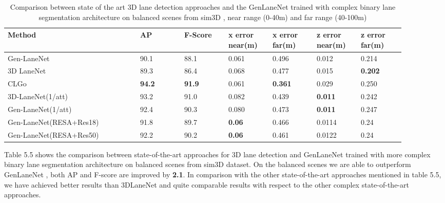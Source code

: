     \begin{table}[htbp]
    \addtolength{\tabcolsep}{-1pt}
    \begin{center}
    \caption{Comparison between state of the art 3D lane detection approaches and the GenLaneNet \cite{guo2020gen} trained with complex binary lane segmentation architecture on balanced scenes from sim3D \cite{guo2020gen}, near range (0-40m) and far range (40-100m)}
    \begin{tabular}{|p{0.3\linewidth}|p{0.1\linewidth}|p{0.1\linewidth}|p{0.1\linewidth}|p{0.1\linewidth}|p{0.1\linewidth}|p{0.1\linewidth}|}
    \hline
        \textbf{Method} & \textbf{AP} & \textbf{F-Score} & \textbf{x error near(m)} & \textbf{x error far(m)} & \textbf{z error near(m)} & \textbf{z error far(m)} \\ \hline
        Gen-LaneNet\cite{guo2020gen} & 90.1 & 88.1 & 0.061 & 0.496 & 0.012 & 0.214 \\ \hline
        3D LaneNet \cite{DBLP:journals/corr/abs-1811-10203}& 89.3 & 86.4 & 0.068 & 0.477 & 0.015 & \textbf{0.202} \\ \hline
        CLGo \cite{DBLP:journals/corr/abs-2112-15351}& \textbf{94.2} &\textbf{ 91.9} & 0.061 & \textbf{0.361} & 0.029 & 0.250 \\ \hline
        3D-LaneNet(1/att) \cite{9506296} &  93.2 & 91.0 & 0.082 & 0.439 & \textbf{0.011} & 0.242 \\ \hline
        Gen-LaneNet(1/att) \cite{9506296}& 92.4 & 90.3 & 0.080 & 0.473 & \textbf{0.011} & 0.247 \\ \hline
        Gen-LaneNet(RESA+Res18) & 91.8 & 89.7 & \textbf{0.06} & 0.466 & 0.0114 & 0.24 \\ \hline
        Gen-LaneNet(RESA+Res50) & 92.2 & 90.2 &\textbf{ 0.06} & 0.461 & 0.0122 & 0.24 \\ \hline
    \end{tabular}
    \end{center}
    \end{table}
    
    Table 5.5 shows the comparison between state-of-the-art approaches for 3D lane detection and GenLaneNet \cite{guo2020gen} trained with more complex binary lane segmentation architecture on balanced scenes from sim3D dataset\cite{guo2020gen}. On the balanced scenes we are able to outperform GenLaneNet \cite{guo2020gen}, both AP and F-score are improved by \textbf{2.1}. In comparison with the other state-of-the-art approaches mentioned in table 5.5, we have achieved better results than 3DLaneNet \cite{DBLP:journals/corr/abs-1811-10203} and quite comparable results with respect to the other complex state-of-the-art approaches. 
        

